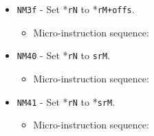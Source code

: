 \documentclass{article}
\def\specialtodata#1{\Verb|#1002| - output \Verb|sr#1| to data bus}
\def\specialptodata#1{\Verb|#1202| - output *\Verb|sr#1| to data bus}
\def\pkptrout{\Verb|0202| - output *\Verb|pk| to data bus}
\def\datatooffs{\Verb|4402| - write to \Verb|offs| from data bus}
\def\incrementpk{\Verb|0502| - increment \Verb|pk|}
\def\regtoaddr#1{\Verb|#1103| - output \Verb|r#1| to addr bus}
\def\regptodatao#1{\Verb|#1303| - output *(\Verb|r#1|+\Verb|offs|) to data bus}
\def\writeRAM{\Verb|0004| - write data bus to *(addr bus)}
\def\echodatalong{\Verb|0025| - echo data bus to itself for 3 cycles}
\def\done{\Verb|fffe| - end instruction}
\begin{document}
\begin{itemize}
    \item \Verb|NM3f| - Set *\Verb|rN| to *\Verb|rM+offs|.
    \begin{itemize}
        \item Micro-instruction sequence:
    \end{itemize}
    
    \item \Verb|NM40| - Set *\Verb|rN| to \Verb|srM|.
    \begin{itemize}
        \item Micro-instruction sequence:
    \end{itemize}

    \item \Verb|NM41| - Set *\Verb|rN| to *\Verb|srM|.
    \begin{itemize}
        \item Micro-instruction sequence:
    \end{itemize}


\end{itemize}
\end{document}
